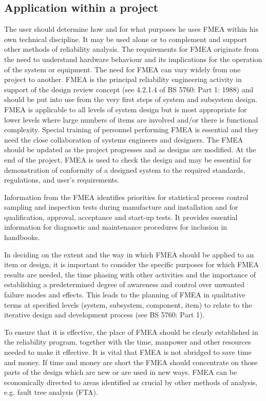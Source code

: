 \documentclass[./dissertation.tex]{subfiles}
\begin{document}
\subsection{Application within a project}
The user should determine how and for what purposes he uses FMEA within his own technical discipline. It may be used alone or to complement and support other methods of reliability analysis. The requirements for FMEA originate from the need to understand hardware behaviour and its implications for the operation of the system or equipment. The need for FMEA can vary widely from one project to another. FMEA is the principal reliability engineering activity in support of the design review concept (see 4.2.1.4 of BS 5760: Part 1: 1988) and should be put into use from the very first steps of system and subsystem design. FMEA is applicable to all levels of system design but is most appropriate for lower levels where large numbers of items are involved and/or there is functional complexity. Special training of personnel performing FMEA is essential and they need the close collaboration of systems engineers and designers. The FMEA should be updated as the project progresses and as designs are modified. At the end of the project, FMEA is used to check the design and may be essential for demonstration of conformity of a designed system to the required standards, regulations, and user's requirements.

Information from the FMEA identifies priorities for statistical process control sampling and inspection tests during manufacture and installation and for qualification, approval, acceptance and start-up tests. It provides essential information for diagnostic and maintenance procedures for inclusion in handbooks.

In deciding on the extent and the way in which FMEA should be applied to an item or design, it is important to consider the specific purposes for which FMEA results are needed, the time phasing with other activities and the importance of establishing a predetermined degree of awareness and control over unwanted failure modes and effects. This leads to the planning of FMEA in qualitative terms at specified levels (system, subsystem, component, item) to relate to the iterative design and development process (see BS 5760: Part 1).

To ensure that it is effective, the place of FMEA should be clearly established in the reliability program, together with the time, manpower and other resources needed to make it effective. It is vital that FMEA is not abridged to save time and money. If time and money are short the FMEA should concentrate on those parts of the design which are new or are used in new ways. FMEA can be economically directed to areas identified as crucial by other methods of analysis, e.g. fault tree analysis (FTA).
\end{document}
